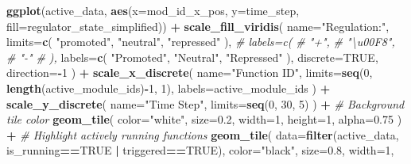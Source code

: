 \documentclass[
]{book}
\newenvironment{Shaded}{\begin{snugshade}}{\end{snugshade}}
\newcommand{\CommentTok}[1]{\textcolor[rgb]{0.56,0.35,0.01}{\textit{#1}}}
\newcommand{\DataTypeTok}[1]{\textcolor[rgb]{0.13,0.29,0.53}{#1}}
\newcommand{\DecValTok}[1]{\textcolor[rgb]{0.00,0.00,0.81}{#1}}
\newcommand{\FloatTok}[1]{\textcolor[rgb]{0.00,0.00,0.81}{#1}}
\newcommand{\KeywordTok}[1]{\textcolor[rgb]{0.13,0.29,0.53}{\textbf{#1}}}
\newcommand{\NormalTok}[1]{#1}
\newcommand{\OperatorTok}[1]{\textcolor[rgb]{0.81,0.36,0.00}{\textbf{#1}}}
\newcommand{\OtherTok}[1]{\textcolor[rgb]{0.56,0.35,0.01}{#1}}
\newcommand{\StringTok}[1]{\textcolor[rgb]{0.31,0.60,0.02}{#1}}
\begin{document}
\begin{Shaded}
\begin{Highlighting}[]
\KeywordTok{ggplot}\NormalTok{(active\_data, }\KeywordTok{aes}\NormalTok{(}\DataTypeTok{x=}\NormalTok{mod\_id\_x\_pos, }\DataTypeTok{y=}\NormalTok{time\_step, }\DataTypeTok{fill=}\NormalTok{regulator\_state\_simplified)) }\OperatorTok{+}
\StringTok{  }\KeywordTok{scale\_fill\_viridis}\NormalTok{(}
    \DataTypeTok{name=}\StringTok{"Regulation:"}\NormalTok{,}
    \DataTypeTok{limits=}\KeywordTok{c}\NormalTok{(}
      \StringTok{"promoted"}\NormalTok{,}
      \StringTok{"neutral"}\NormalTok{,}
      \StringTok{"repressed"}
\NormalTok{    ),}
    \CommentTok{\# labels=c(}
    \CommentTok{\#   "+",}
    \CommentTok{\#   "\textbackslash{}u00F8",}
    \CommentTok{\#   "{-}"}
    \CommentTok{\# ),}
    \DataTypeTok{labels=}\KeywordTok{c}\NormalTok{(}
      \StringTok{"Promoted"}\NormalTok{,}
      \StringTok{"Neutral"}\NormalTok{,}
      \StringTok{"Repressed"}
\NormalTok{    ),}
    \DataTypeTok{discrete=}\OtherTok{TRUE}\NormalTok{,}
    \DataTypeTok{direction=}\OperatorTok{{-}}\DecValTok{1}
\NormalTok{  ) }\OperatorTok{+}
\StringTok{  }\KeywordTok{scale\_x\_discrete}\NormalTok{(}
    \DataTypeTok{name=}\StringTok{"Function ID"}\NormalTok{,}
    \DataTypeTok{limits=}\KeywordTok{seq}\NormalTok{(}\DecValTok{0}\NormalTok{, }\KeywordTok{length}\NormalTok{(active\_module\_ids)}\OperatorTok{{-}}\DecValTok{1}\NormalTok{, }\DecValTok{1}\NormalTok{),}
    \DataTypeTok{labels=}\NormalTok{active\_module\_ids}
\NormalTok{  ) }\OperatorTok{+}
\StringTok{  }\KeywordTok{scale\_y\_discrete}\NormalTok{(}
    \DataTypeTok{name=}\StringTok{"Time Step"}\NormalTok{,}
    \DataTypeTok{limits=}\KeywordTok{seq}\NormalTok{(}\DecValTok{0}\NormalTok{, }\DecValTok{30}\NormalTok{, }\DecValTok{5}\NormalTok{)}
\NormalTok{  ) }\OperatorTok{+}
\StringTok{  }\CommentTok{\# Background tile color}
\StringTok{  }\KeywordTok{geom\_tile}\NormalTok{(}
    \DataTypeTok{color=}\StringTok{"white"}\NormalTok{,}
    \DataTypeTok{size=}\FloatTok{0.2}\NormalTok{,}
    \DataTypeTok{width=}\DecValTok{1}\NormalTok{,}
    \DataTypeTok{height=}\DecValTok{1}\NormalTok{,}
    \DataTypeTok{alpha=}\FloatTok{0.75}
\NormalTok{  ) }\OperatorTok{+}
\StringTok{  }\CommentTok{\# Highlight actively running functions}
\StringTok{  }\KeywordTok{geom\_tile}\NormalTok{(}
    \DataTypeTok{data=}\KeywordTok{filter}\NormalTok{(active\_data, is\_running}\OperatorTok{==}\OtherTok{TRUE} \OperatorTok{|}\StringTok{ }\NormalTok{triggered}\OperatorTok{==}\OtherTok{TRUE}\NormalTok{),}
    \DataTypeTok{color=}\StringTok{"black"}\NormalTok{,}
    \DataTypeTok{size=}\FloatTok{0.8}\NormalTok{,}
    \DataTypeTok{width=}\DecValTok{1}\NormalTok{,}

\end{Highlighting}
\end{Shaded}
\end{document}
